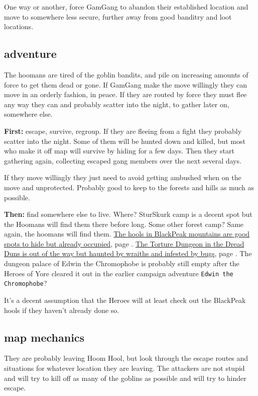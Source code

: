 One way or another, force GamGang to abandon their established location and move to somewhere less secure, further away from good banditry and loot locations.


\subsection*{adventure}

The hoomans are tired of the goblin bandits, and pile on increasing amounts of force to get them dead or gone. If GamGang make the move willingly they can move in an orderly fashion, in peace. If they are routed by force they must flee any way they can and probably scatter into the night, to gather later on, somewhere else.

\textbf{First:} escape, survive, regroup. If they are fleeing from a fight they probably scatter into the night. Some of them will be hunted down and killed, but most who make it off map will survive by hiding for a few days. Then they start gathering again, collecting escaped gang members over the next several days.

If they move willingly they just need to avoid getting ambushed when on the move and unprotected. Probably good to keep to the forests and hills as much as possible.

\textbf{Then:} find somewhere else to live. Where? SturSkurk camp is a decent spot but the Hoomans will find them there before long. Some other forest camp? Same again, the hoomans will find them. 
\hyperref[appendixmountaingoblins]{The hools in BlackPeak mountains are good spots to hide but already occupied}, page \pageref{appendixmountaingoblins}. 
\hyperref[appendixtorturedungeon]{The Torture Dungeon in the Dread Duns is out of the way but haunted by wraiths and infested by bugs}, page \pageref{appendixtorturedungeon}. 
The dungeon palace of Edwin the Chromophobe is probably still empty after the Heroes of Yore cleared it out in the earlier campaign adventure \texttt{Edwin the Chromophobe}?

It's a decent assumption that the Heroes will at least check out the BlackPeak hools if they haven't already done so. 


\subsection*{map mechanics}

They are probably leaving Hoom Hool, but look through the escape routes and situations for whatever location they are leaving. The attackers are not stupid and will try to kill off as many of the goblins as possible and will try to hinder escape.

